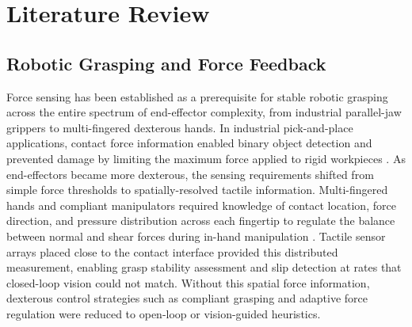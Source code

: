 \documentclass[12pt, a4paper]{report}
\begin{document}
\chapter{Literature Review}

\section{Robotic Grasping and Force Feedback}
Force sensing has been established as a prerequisite for stable robotic grasping across the entire spectrum of end-effector complexity, from industrial parallel-jaw grippers to multi-fingered dexterous hands. In industrial pick-and-place applications, contact force information enabled binary object detection and prevented damage by limiting the maximum force applied to rigid workpieces \cite{dahiya2010}. As end-effectors became more dexterous, the sensing requirements shifted from simple force thresholds to spatially-resolved tactile information. Multi-fingered hands and compliant manipulators required knowledge of contact location, force direction, and pressure distribution across each fingertip to regulate the balance between normal and shear forces during in-hand manipulation \cite{dahiya2010}. Tactile sensor arrays placed close to the contact interface provided this distributed measurement, enabling grasp stability assessment and slip detection at rates that closed-loop vision could not match. %
Without this spatial force information, dexterous control strategies such as compliant grasping and adaptive force regulation were reduced to open-loop or vision-guided heuristics.
\end{document}
